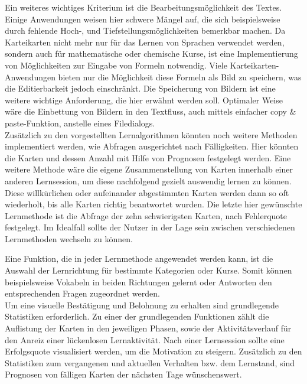 Ein weiteres wichtiges Kriterium ist die Bearbeitungsmöglichkeit des Textes. Einige Anwendungen weisen hier schwere Mängel auf, die sich beispielsweise durch fehlende Hoch-, und Tiefstellungsmöglichkeiten bemerkbar machen. Da Karteikarten nicht mehr nur für das Lernen von Sprachen verwendet werden, sondern auch für mathematische oder chemische Kurse, ist eine Implementierung von Möglichkeiten zur Eingabe von Formeln notwendig. Viele Karteikarten-Anwendungen bieten nur die Möglichkeit diese Formeln als Bild zu speichern, was die Editierbarkeit jedoch einschränkt. Die Speicherung von Bildern ist eine weitere wichtige Anforderung, die hier erwähnt werden soll. Optimaler Weise wäre die Einbettung von Bildern in den Textfluss, auch mittels einfacher copy {\&} paste-Funktion, anstelle eines Filedialogs. \\

Zusätzlich zu den vorgestellten Lernalgorithmen könnten noch weitere Methoden implementiert werden, wie Abfragen ausgerichtet nach Fälligkeiten. Hier könnten die Karten und dessen Anzahl mit Hilfe von Prognosen festgelegt werden. Eine weitere Methode wäre die eigene Zusammenstellung von Karten innerhalb einer anderen Lernsession, um diese nachfolgend gezielt auswendig lernen zu können. Diese willkürlichen oder aufeinander abgestimmten Karten werden dann so oft wiederholt, bis alle Karten richtig beantwortet wurden. Die letzte hier gewünschte Lernmethode ist die Abfrage der zehn schwierigsten Karten, nach Fehlerquote festgelegt. Im Idealfall sollte der Nutzer in der Lage sein zwischen verschiedenen Lernmethoden wechseln zu können. 

Eine Funktion, die in jeder Lernmethode angewendet werden kann, ist die Auswahl der Lernrichtung für bestimmte Kategorien oder Kurse. Somit können beispielsweise Vokabeln in beiden Richtungen gelernt oder Antworten den entsprechenden Fragen zugeordnet werden. \\

Um eine visuelle Bestätigung und Belohnung zu erhalten sind grundlegende Statistiken erforderlich. Zu einer der grundlegenden Funktionen zählt die Auflistung der Karten in den jeweiligen Phasen, sowie der Aktivitätsverlauf für den Anreiz einer lückenlosen Lernaktivität. Nach einer Lernsession sollte eine Erfolgsquote visualisiert werden, um die Motivation zu steigern. Zusätzlich zu den Statistiken zum vergangenen und aktuellen Verhalten bzw. dem Lernstand, sind Prognosen von fälligen Karten der nächsten Tage wünschenswert. \\

